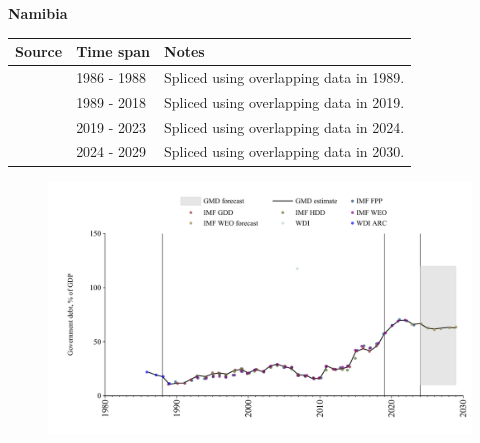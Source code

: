 \documentclass[12pt,a4paper,landscape]{article}
\begin{document}
\begin{adjustbox}{max totalsize={\paperwidth}{\paperheight},center}
\begin{minipage}[t][\textheight][t]{\textwidth}
\vspace*{0.5cm}
{}
\begin{center}
{\Large\bfseries Namibia}
\end{center}
\vspace{0.5cm}
\begin{table}[H]
\centering
\small
\begin{tabular}{|l|l|l|}
\hline
\textbf{Source} & \textbf{Time span} & \textbf{Notes} \\
\hline
\rowcolor{white}\cite{WDI_ARC}& 1986 - 1988 &Spliced using overlapping data in 1989.\\
\rowcolor{lightgray}\cite{IMF_GDD}& 1989 - 2018 &Spliced using overlapping data in 2019.\\
\rowcolor{white}\cite{IMF_FPP}& 2019 - 2023 &Spliced using overlapping data in 2024.\\
\rowcolor{lightgray}\cite{IMF_WEO_forecast}& 2024 - 2029 &Spliced using overlapping data in 2030.\\
\hline
\end{tabular}
\end{table}
\begin{figure}[H]
\centering
\includegraphics[width=\textwidth,height=0.6\textheight,keepaspectratio]{graphs/NAM_govdebt_GDP.pdf}
\end{figure}
\end{minipage}
\end{adjustbox}
\end{document}
